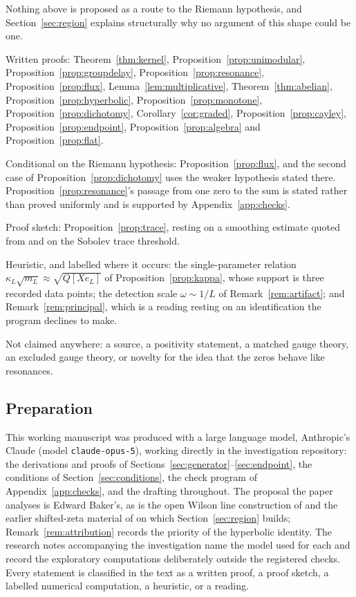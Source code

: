 Nothing above is proposed as a route to the Riemann hypothesis, and
Section~\ref{sec:region} explains structurally why no argument of this shape could
be one.

Written proofs: Theorem~\ref{thm:kernel}, Proposition~\ref{prop:unimodular},
Proposition~\ref{prop:groupdelay}, Proposition~\ref{prop:resonance},
Proposition~\ref{prop:flux}, Lemma~\ref{lem:multiplicative},
Theorem~\ref{thm:abelian}, Proposition~\ref{prop:hyperbolic},
Proposition~\ref{prop:monotone}, Proposition~\ref{prop:dichotomy},
Corollary~\ref{cor:graded}, Proposition~\ref{prop:cayley},
Proposition~\ref{prop:endpoint}, Proposition~\ref{prop:algebra} and
Proposition~\ref{prop:flat}.

Conditional on the Riemann hypothesis: Proposition~\ref{prop:flux}, and the
second case of Proposition~\ref{prop:dichotomy} uses the weaker hypothesis stated
there. Proposition~\ref{prop:resonance}'s passage from one zero to the sum is
stated rather than proved uniformly and is supported by
Appendix~\ref{app:checks}.

Proof sketch: Proposition~\ref{prop:trace}, resting on a smoothing estimate
quoted from \cite{Background} and on the Sobolev trace threshold.

Heuristic, and labelled where it occurs: the single-parameter relation
$\kappa_L\sqrt{m_L}\approx\sqrt{Q[Xe_L]}$ of Proposition~\ref{prop:kappa}, whose
support is three recorded data points; the detection scale $\omega\sim1/L$ of
Remark~\ref{rem:artifact}; and Remark~\ref{rem:principal}, which is a reading
resting on an identification the program declines to make.

Not claimed anywhere: a source, a positivity statement, a matched gauge theory,
an excluded gauge theory, or novelty for the idea that the zeros behave like
resonances.

\subsection*{Preparation}

This working manuscript was produced with a large language model, Anthropic's
Claude (model \texttt{claude-opus-5}), working directly in the investigation
repository: the derivations and proofs of
Sections~\ref{sec:generator}--\ref{sec:endpoint}, the conditions of
Section~\ref{sec:conditions}, the check program of Appendix~\ref{app:checks}, and
the drafting throughout. The proposal the paper analyses is Edward Baker's, as is
the open Wilson line construction of \cite{OWL} and the earlier shifted-zeta
material of \cite{CriticalPath,CumulativePath} on which Section~\ref{sec:region}
builds; Remark~\ref{rem:attribution} records the priority of the hyperbolic
identity. The research notes accompanying the investigation name the model used
for each and record the exploratory computations deliberately outside the
registered checks. Every statement is classified in the text as a written proof,
a proof sketch, a labelled numerical computation, a heuristic, or a reading.
